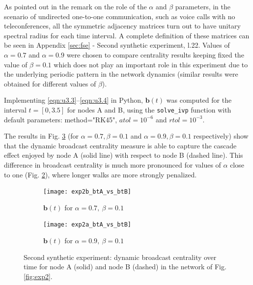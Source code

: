 As pointed out in the remark on the role of the $\alpha$ and $\beta$ parameters, in the scenario of undirected one-to-one communication, such as voice calls with no teleconferences, all the symmetric adjacency matrices turn out to have unitary spectral radius for each time interval. A complete definition of these matrices can be seen in Appendix \ref{sec:fse} - Second synthetic experiment, l.22. Values of $\alpha=0.7$ and $\alpha=0.9$ were chosen to compare centrality results keeping fixed the value of $\beta=0.1$ which does not play an important role in this experiment due to the underlying periodic pattern in the network dynamics (similar results were obtained for different values of $\beta$). 

Implementing \eqref{eqn:u3.3}--\eqref{eqn:u3.4} in Python, $\mathbf{b}(t)$ was computed for the interval $t=[0,3.5]$ for nodes A and B, using the \texttt{solve\_ivp} function with default parameters: method="RK45", $atol=10^{-6}$ and $rtol=10^{-3}$.

The results in Fig. \ref{fig:twobt} (for $\alpha = 0.7, \beta = 0.1$ and $\alpha = 0.9 , \beta = 0.1$ respectively) show that the dynamic broadcast centrality measure is able to capture the cascade effect enjoyed by node A (solid line) with respect to node B (dashed line). This difference in broadcast centrality is much more pronounced for values of $\alpha$ close to one (Fig. \ref{fig:bt6}), where longer walks are more strongly penalized. 

\begin{figure}
     \centering
     \begin{subfigure}[b]{0.49\textwidth}
         \centering
         \texttt{[image: exp2b\_btA\_vs\_btB]}
         \caption{$\mathbf{b}(t)$ for $\alpha = 0.7 ,~\beta = 0.1$}
         \label{fig:bt5}
     \end{subfigure}
     \hfill
     \begin{subfigure}[b]{0.49\textwidth}
         \centering
         \texttt{[image: exp2a\_btA\_vs\_btB]}
         \caption{$\mathbf{b}(t)$ for $\alpha = 0.9 ,~\beta = 0.1$}
         \label{fig:bt6}
     \end{subfigure}
     \caption{Second synthetic experiment: dynamic broadcast centrality over time for node A (solid) and node B (dashed) in the network of Fig. \ref{fig:exp2}.}
     \label{fig:twobt}
\end{figure}

